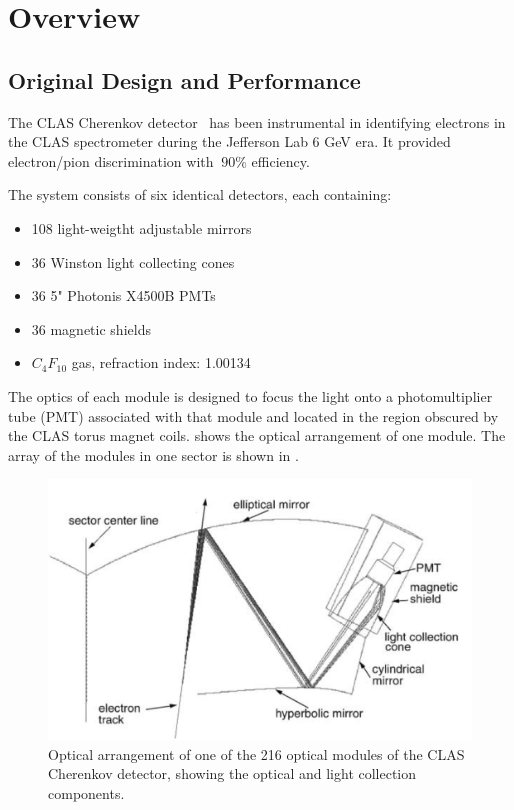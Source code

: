 \section{Overview}



\subsection{Original Design and Performance}

The CLAS Cherenkov detector~\cite{Adams:2001kk} has been instrumental in identifying electrons in the CLAS spectrometer during the Jefferson Lab 6 GeV era.
It provided electron/pion discrimination with $~90\%$ efficiency.

The system consists of six identical detectors, each containing:

\begin{itemize}
	\item 108 light-weigtht adjustable mirrors
	\item 36 Winston light collecting cones
	\item 36 5" Photonis X4500B PMTs
	\item 36 magnetic shields
\item $C_4F_{10}$ gas, refraction index: 1.00134
\end{itemize}


The optics of each module is designed to focus the light onto a photomultiplier tube (PMT) associated with that module and located in the region
obscured by the CLAS torus magnet coils.
 shows the optical arrangement of one module. The array of the modules in one sector is shown in .

\begin{figure}
	\centering
	\includegraphics[width=1.0\columnwidth,keepaspectratio]{img/optics.png}
	\caption{Optical arrangement of one of the 216 optical modules of the CLAS Cherenkov detector, showing the optical and light collection components.}
	\label{fig:optics}
\end{figure}

